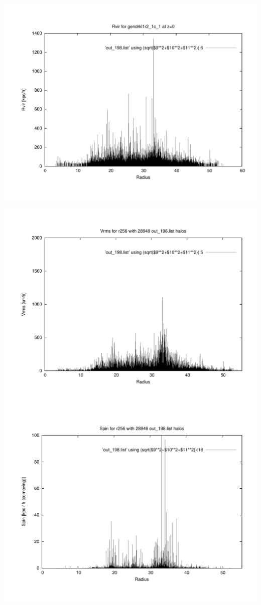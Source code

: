 \includegraphics[scale=0.3]{r256/gendrkl1r2_1c_1/plot_rvir_z0.pdf}

\includegraphics[scale=0.3]{r256/gendrkl1r2_1c_1/plot_Vrms_out_198.pdf}
\includegraphics[scale=0.3]{r256/gendrkl1r2_1c_1/plot_spin_out_198.pdf}

